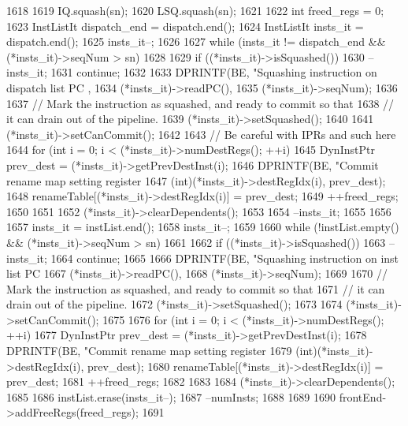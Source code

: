 \begin{DoxyCode}
1618 {
1619     IQ.squash(sn);
1620     LSQ.squash(sn);
1621 
1622     int freed_regs = 0;
1623     InstListIt dispatch_end = dispatch.end();
1624     InstListIt insts_it = dispatch.end();
1625     insts_it--;
1626 
1627     while (insts_it != dispatch_end && (*insts_it)->seqNum > sn)
1628     {
1629         if ((*insts_it)->isSquashed()) {
1630             --insts_it;
1631             continue;
1632         }
1633         DPRINTF(BE, "Squashing instruction on dispatch list PC %
      ,
1634                 (*insts_it)->readPC(),
1635                 (*insts_it)->seqNum);
1636 
1637         // Mark the instruction as squashed, and ready to commit so that
1638         // it can drain out of the pipeline.
1639         (*insts_it)->setSquashed();
1640 
1641         (*insts_it)->setCanCommit();
1642 
1643         // Be careful with IPRs and such here
1644         for (int i = 0; i < (*insts_it)->numDestRegs(); ++i) {
1645             DynInstPtr prev_dest = (*insts_it)->getPrevDestInst(i);
1646             DPRINTF(BE, "Commit rename map setting register %
1647                     (int)(*insts_it)->destRegIdx(i), prev_dest);
1648             renameTable[(*insts_it)->destRegIdx(i)] = prev_dest;
1649             ++freed_regs;
1650         }
1651 
1652         (*insts_it)->clearDependents();
1653 
1654         --insts_it;
1655     }
1656 
1657     insts_it = instList.end();
1658     insts_it--;
1659 
1660     while (!instList.empty() && (*insts_it)->seqNum > sn)
1661     {
1662         if ((*insts_it)->isSquashed()) {
1663             --insts_it;
1664             continue;
1665         }
1666         DPRINTF(BE, "Squashing instruction on inst list PC %
1667                 (*insts_it)->readPC(),
1668                 (*insts_it)->seqNum);
1669 
1670         // Mark the instruction as squashed, and ready to commit so that
1671         // it can drain out of the pipeline.
1672         (*insts_it)->setSquashed();
1673 
1674         (*insts_it)->setCanCommit();
1675 
1676         for (int i = 0; i < (*insts_it)->numDestRegs(); ++i) {
1677             DynInstPtr prev_dest = (*insts_it)->getPrevDestInst(i);
1678             DPRINTF(BE, "Commit rename map setting register %
1679                     (int)(*insts_it)->destRegIdx(i), prev_dest);
1680             renameTable[(*insts_it)->destRegIdx(i)] = prev_dest;
1681             ++freed_regs;
1682         }
1683 
1684         (*insts_it)->clearDependents();
1685 
1686         instList.erase(insts_it--);
1687         --numInsts;
1688     }
1689 
1690     frontEnd->addFreeRegs(freed_regs);
1691 }
\end{DoxyCode}
